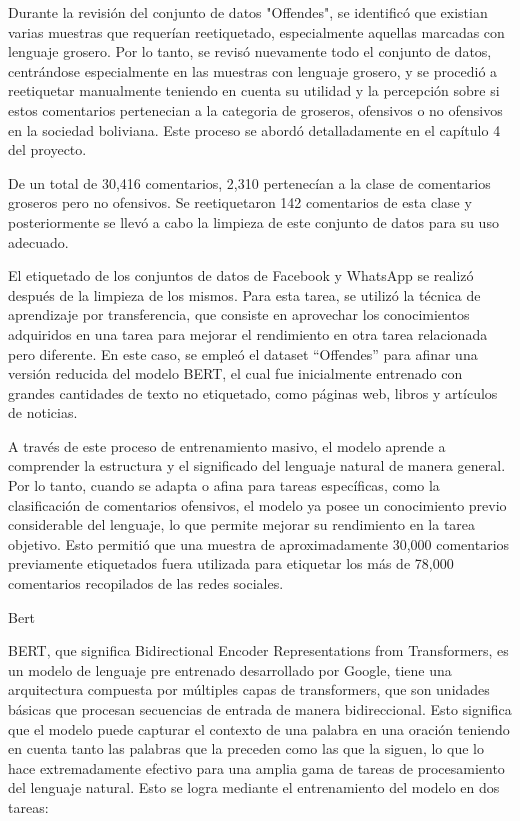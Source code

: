 Durante la revisión del conjunto de datos "Offendes", se identificó que existian varias muestras que requerían reetiquetado, especialmente aquellas marcadas con lenguaje grosero. Por lo tanto, se revisó nuevamente todo el conjunto de datos, centrándose especialmente en las muestras con lenguaje grosero, y se procedió a reetiquetar manualmente teniendo en cuenta su utilidad y la percepción sobre si estos comentarios pertenecian a la categoria de groseros, ofensivos o no ofensivos en la sociedad boliviana. Este proceso se abordó detalladamente en el capítulo 4 del proyecto.

De un total de 30,416 comentarios, 2,310 pertenecían a la clase de comentarios groseros pero no ofensivos. Se reetiquetaron 142 comentarios de esta clase y posteriormente se llevó a cabo la limpieza de este conjunto de datos para su uso adecuado.

El etiquetado de los conjuntos de datos de Facebook y WhatsApp se realizó después de la limpieza de los mismos. Para esta tarea, se utilizó la técnica de aprendizaje por transferencia, que consiste en aprovechar los conocimientos adquiridos en una tarea para mejorar el rendimiento en otra tarea relacionada pero diferente. En este caso, se empleó el dataset ``Offendes'' para afinar una versión reducida del modelo BERT, el cual fue inicialmente entrenado con grandes cantidades de texto no etiquetado, como páginas web, libros y artículos de noticias.

A través de este proceso de entrenamiento masivo, el modelo aprende a comprender la estructura y el significado del lenguaje natural de manera general. Por lo tanto, cuando se adapta o afina para tareas específicas, como la clasificación de comentarios ofensivos, el modelo ya posee un conocimiento previo considerable del lenguaje, lo que permite mejorar su rendimiento en la tarea objetivo. Esto permitió que una muestra de aproximadamente 30,000 comentarios previamente etiquetados fuera utilizada para etiquetar los más de 78,000 comentarios recopilados de las redes sociales.

Bert

BERT, que significa Bidirectional Encoder Representations from Transformers, es un modelo de lenguaje pre entrenado desarrollado por Google, tiene una arquitectura compuesta por múltiples capas de transformers, que son unidades básicas que procesan secuencias de entrada de manera bidireccional. Esto significa que el modelo puede capturar el contexto de una palabra en una oración teniendo en cuenta tanto las palabras que la preceden como las que la siguen, lo que lo hace extremadamente efectivo para una amplia gama de tareas de procesamiento del lenguaje natural. Esto se logra mediante el entrenamiento del modelo en dos tareas: 

